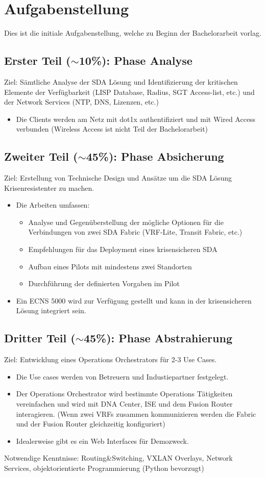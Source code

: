 \section{Aufgabenstellung}
Dies ist die initiale Aufgabenstellung, welche zu Beginn der Bachelorarbeit vorlag. 

\subsection{Erster Teil ($\sim$10\%): Phase Analyse}
Ziel: Sämtliche Analyse der SDA Lösung und Identifizierung der kritischen Elemente der Verfügbarkeit (LISP Database, Radius, SGT Access-list, etc.) und der Network Services (NTP, DNS, Lizenzen, etc.)
\begin{itemize}
	\item Die Clients werden am Netz mit dot1x authentifiziert und mit Wired Access verbunden (Wireless Access ist nicht Teil der Bachelorarbeit)
\end{itemize}


\subsection{Zweiter Teil ($\sim$45\%): Phase Absicherung}
Ziel: Erstellung von Technische Design und Ansätze um die SDA Lösung Krisenresistenter zu machen.
\begin{itemize}
	\item Die Arbeiten umfassen:
	\begin{itemize}
		\item Analyse und Gegenüberstellung der mögliche Optionen für die Verbindungen von zwei SDA Fabric (VRF-Lite, Transit Fabric, etc.)
		\item Empfehlungen für das Deployment eines krisensicheren SDA
		\item Aufbau eines Pilots mit mindestens zwei Standorten
		\item Durchführung der definierten Vorgaben im Pilot
	\end{itemize}
	\item Ein ECNS 5000 wird zur Verfügung gestellt und kann in der krisensicheren Lösung integriert sein.
\end{itemize}


\subsection{Dritter Teil ($\sim$45\%): Phase Abstrahierung}
Ziel: Entwicklung eines Operations Orchestrators für 2-{\tiny }3 Use Cases. 
\begin{itemize}
	\item Die Use cases werden von Betreuern und Industiepartner festgelegt.
	\item Der Operations Orchestrator wird bestimmte Operations Tätigkeiten vereinfachen und wird mit DNA Center, ISE und dem Fusion Router interagieren. (Wenn zwei VRFs zusammen kommunizieren werden die Fabric und der Fusion Router gleichzeitig konfiguriert)
	\item Idealerweise gibt es ein Web Interfaces für Demozweck.
\end{itemize}

Notwendige Kenntnisse: Routing\&Switching, VXLAN Overlays, Network Services, objektorientierte Programmierung (Python bevorzugt)


